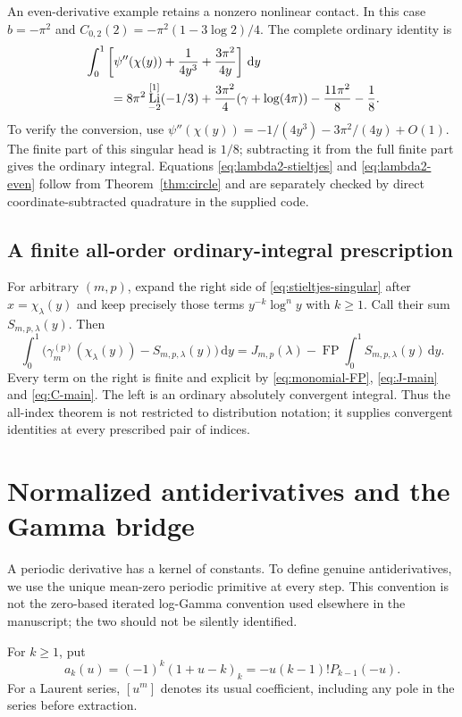 \documentclass[11pt]{article}
\theoremstyle{definition}\newtheorem{definition}[theorem]{Definition}
\theoremstyle{remark}\newtheorem{remark}[theorem]{Remark}
\DeclareMathOperator{\Li}{Li}
\DeclareMathOperator{\FP}{FP}
\newcommand{\dd}{\,\mathrm d}
\newcommand{\LiJ}[2]{\Li_{#1}^{[#2]}}
\begin{document}
An even-derivative example retains a nonzero nonlinear contact. In this case $b=-\pi^2$ and
$C_{0,2}(2)=-\pi^2(1-3\log2)/4$.
The complete ordinary identity is
\begin{align}\label{eq:lambda2-even}
&\int_0^1\left[\psi''(\chi(y))+\frac1{4y^3}
+\frac{3\pi^2}{4y}\right]\dd y\\
&\qquad=8\pi^2\LiJ{-2}{1}(-1/3)
+\frac{3\pi^2}{4}(\gamma+\log(4\pi))
-\frac{11\pi^2}{8}-\frac18.\notag
\end{align}
To verify the conversion, use
$\psi''(\chi(y))=-1/(4y^3)-3\pi^2/(4y)+O(1)$.
The finite part of this singular head is $1/8$; subtracting it from the full finite part gives the ordinary integral. Equations \eqref{eq:lambda2-stieltjes} and \eqref{eq:lambda2-even} follow from Theorem~\ref{thm:circle} and are separately checked by direct coordinate-subtracted quadrature in the supplied code.

\subsection{A finite all-order ordinary-integral prescription}
For arbitrary $(m,p)$, expand the right side of \eqref{eq:stieltjes-singular} after $x=\chi_\lambda(y)$ and keep precisely those terms $y^{-k}\log^n y$ with $k\ge1$. Call their sum $S_{m,p,\lambda}(y)$. Then
\begin{equation}\label{eq:ordinary-general}
\int_0^1\bigl(\gamma_m^{(p)}(\chi_\lambda(y))-S_{m,p,\lambda}(y)\bigr)\dd y
=J_{m,p}(\lambda)-\FP\int_0^1S_{m,p,\lambda}(y)\dd y.
\end{equation}
Every term on the right is finite and explicit by \eqref{eq:monomial-FP}, \eqref{eq:J-main} and \eqref{eq:C-main}. The left is an ordinary absolutely convergent integral. Thus the all-index theorem is not restricted to distribution notation; it supplies convergent identities at every prescribed pair of indices.

\section{Normalized antiderivatives and the Gamma bridge}
\label{sec:primitives}
A periodic derivative has a kernel of constants. To define genuine antiderivatives, we use the unique mean-zero periodic primitive at every step. This convention is not the zero-based iterated log-Gamma convention used elsewhere in the manuscript; the two should not be silently identified.

For $k\ge1$, put
\begin{equation}\label{eq:ak}
a_k(u)=(-1)^k(1+u-k)_k
=-u(k-1)!P_{k-1}(-u).
\end{equation}
For a Laurent series, $[u^m]$ denotes its usual coefficient, including any pole in the series before extraction.
\end{document}
